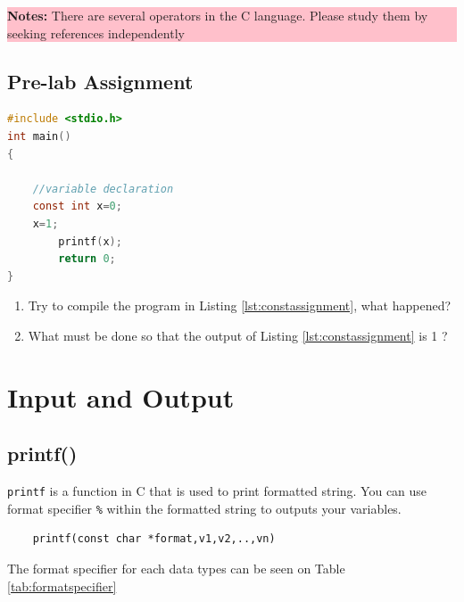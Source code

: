 \begin{center}
	\colorbox{pink}{\parbox{0.8\linewidth}{\textbf{Notes:} There are several operators in the C language. Please study them by seeking references independently}}
\end{center}
\subsection{Pre-lab Assignment}
\begin{lstlisting}[language=c,caption=Using assignment operator in a const variable,label=lst:constassignment,captionpos=t]
#include <stdio.h>
int main()
{

	//variable declaration
    const int x=0;
    x=1;
		printf(x);
		return 0;
}
\end{lstlisting}

\begin{enumerate}
	\item Try to compile the program in Listing \ref{lst:constassignment}, what happened?
	\item What must be done so that the output of Listing \ref{lst:constassignment} is 1 ?
\end{enumerate}

\section{Input and Output}

\subsection{printf()}
\verb*|printf| is a function in C that is used to print formatted string.  You can use format specifier \verb*|%| within the formatted string to outputs your variables.

\begin{verbatim}
	printf(const char *format,v1,v2,..,vn)
\end{verbatim}

The format specifier for each data types can be seen on Table \ref{tab:formatspecifier}


